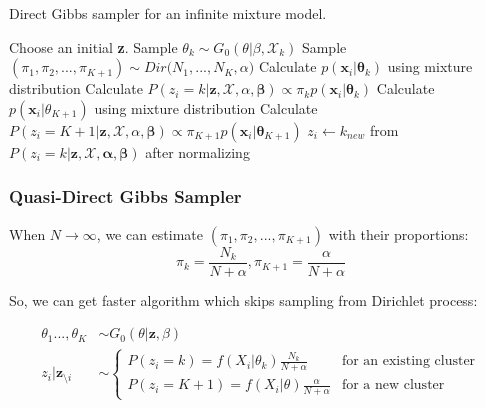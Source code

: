 \documentclass[12pt, a4paper]{article}
\begin{document}
\begin{algorithm}[H]
  \caption{Direct Gibbs sampler for an infinite mixture model.}\label{directgibbs}
  \begin{algorithmic}[1]
    
  \State Choose an initial \textbf{z}.
   
     
            \State Sample $\theta_k \sim G_0(\theta|\beta,\mathcal{X}_{k})$ 
    \EndFor
    \State Sample $(\pi_{1}, \pi_{2},...,\pi_{K+1}) \sim  Dir\big(N_1,...,N_K, \alpha \big)$
         
            \State Calculate $p(\mathbf{x}_i|\mathbf{\theta}_k)$ using mixture distribution
            \State Calculate $P(z_i = k | \mathbf{z},\mathcal{X},\alpha,\mathbf{\beta}) \propto  \pi_k p(\mathbf{x}_i|\mathbf{\theta}_k)$
        \EndFor
        \State Calculate $p(\mathbf{x}_i|\theta_{K+1})$ using mixture distribution
        \State Calculate $P(z_i = K+1 | \mathbf{z},\mathcal{X},\alpha, \mathbf{\beta}) \propto  \pi_{K+1}p(\mathbf{x}_i|\mathbf{\theta}_{K+1})$
        \State $z_i \gets k_{new}$ from $P(z_i = k | \mathbf{z},\mathcal{X},\mathbf{\alpha},\mathbf{\beta})$ after normalizing
    \EndFor
  \EndFor
  \end{algorithmic}
\end{algorithm}


\subsubsection{Quasi-Direct Gibbs Sampler}

When $N \rightarrow \infty$, we can estimate $(\pi_{1}, \pi_{2},...,\pi_{K+1})$ with their proportions:
$$\pi_k = \frac{N_k}{N+\alpha},\pi_{K+1} = \frac{\alpha}{N+\alpha} $$

So, we can get faster algorithm which skips sampling from Dirichlet process:

\begin{align*}
\theta_1...,\theta_K&\sim G_0(\theta|\boldsymbol z, \beta) \\
z_i|\boldsymbol z_{\setminus i} &\sim \begin{cases}
P(z_i=k)= f(X_i|\theta_{k})\frac{N_k}{N+\alpha} & \text{for an existing cluster} \\
P(z_i=K+1)= f(X_i|\theta)\frac{\alpha}{N+\alpha} & \text{for a new cluster}
\end{cases}\\
\end{align*}
\end{document}
